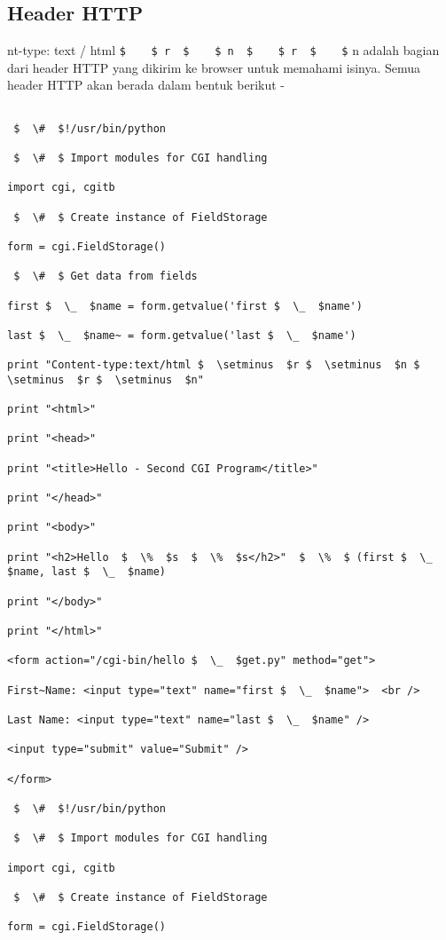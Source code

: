 \begin {enumerate}
\begin {enumerate}
\subsection{Header HTTP}
nt-type: text / html  \verb|$    $ r  $    $ n  $    $ r  $    $| n adalah bagian dari header HTTP yang dikirim ke browser untuk memahami isinya. Semua header HTTP akan berada dalam bentuk berikut -

\begin{verbatim}

 $  \#  $!/usr/bin/python

 $  \#  $ Import modules for CGI handling

import cgi, cgitb

 $  \#  $ Create instance of FieldStorage

form = cgi.FieldStorage()

 $  \#  $ Get data from fields

first $  \_  $name = form.getvalue('first $  \_  $name')

last $  \_  $name~ = form.getvalue('last $  \_  $name')

print "Content-type:text/html $  \setminus  $r $  \setminus  $n $  \setminus  $r $  \setminus  $n"

print "<html>"

print "<head>"

print "<title>Hello - Second CGI Program</title>"

print "</head>"

print "<body>"

print "<h2>Hello  $  \%  $s  $  \%  $s</h2>"  $  \%  $ (first $  \_  $name, last $  \_  $name)

print "</body>"

print "</html>"

<form action="/cgi-bin/hello $  \_  $get.py" method="get">

First~Name: <input type="text" name="first $  \_  $name">  <br />

Last Name: <input type="text" name="last $  \_  $name" />

<input type="submit" value="Submit" />

</form>

 $  \#  $!/usr/bin/python

 $  \#  $ Import modules for CGI handling

import cgi, cgitb

 $  \#  $ Create instance of FieldStorage

form = cgi.FieldStorage()


\end{verbatim}
\end{enumerate}
\end{enumerate}
